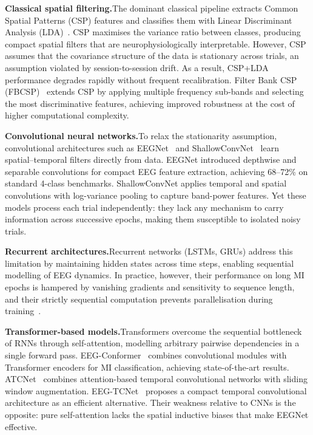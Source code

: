 \documentclass[12pt, a4paper]{article}
\begin{document}
\textbf{Classical spatial filtering.}\quad The dominant classical pipeline extracts Common Spatial Patterns (CSP) features and classifies them with Linear Discriminant Analysis (LDA)~\cite{hameed2025enhancing}. CSP maximises the variance ratio between classes, producing compact spatial filters that are neurophysiologically interpretable. However, CSP assumes that the covariance structure of the data is stationary across trials, an assumption violated by session-to-session drift. As a result, CSP+LDA performance degrades rapidly without frequent recalibration. Filter Bank CSP (FBCSP)~\cite{ang2008fbcsp} extends CSP by applying multiple frequency sub-bands and selecting the most discriminative features, achieving improved robustness at the cost of higher computational complexity.

\textbf{Convolutional neural networks.}\quad To relax the stationarity assumption, convolutional architectures such as EEGNet~\cite{lawhern2018eegnet} and ShallowConvNet~\cite{schirrmeister2017deep} learn spatial--temporal filters directly from data. EEGNet introduced depthwise and separable convolutions for compact EEG feature extraction, achieving 68--72\% on standard 4-class benchmarks. ShallowConvNet applies temporal and spatial convolutions with log-variance pooling to capture band-power features. Yet these models process each trial independently: they lack any mechanism to carry information across successive epochs, making them susceptible to isolated noisy trials.

\textbf{Recurrent architectures.}\quad Recurrent networks (LSTMs, GRUs) address this limitation by maintaining hidden states across time steps, enabling sequential modelling of EEG dynamics. In practice, however, their performance on long MI epochs is hampered by vanishing gradients and sensitivity to sequence length, and their strictly sequential computation prevents parallelisation during training~\cite{vaswani2017attention}.

\textbf{Transformer-based models.}\quad Transformers overcome the sequential bottleneck of RNNs through self-attention, modelling arbitrary pairwise dependencies in a single forward pass. EEG-Conformer~\cite{song2022eeg} combines convolutional modules with Transformer encoders for MI classification, achieving state-of-the-art results. ATCNet~\cite{altaheri2022atcnet} combines attention-based temporal convolutional networks with sliding window augmentation. EEG-TCNet~\cite{ingolfsson2020eeg} proposes a compact temporal convolutional architecture as an efficient alternative. Their weakness relative to CNNs is the opposite: pure self-attention lacks the spatial inductive biases that make EEGNet effective.
\end{document}
